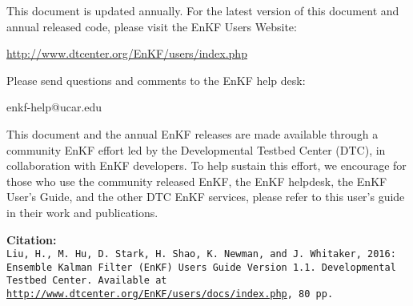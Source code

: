 \begin{titlepage}
\begin{flushleft}
This document is updated annually. For the latest version of this document and annual released code, please visit the EnKF User\textquotesingle s Website:
\begin{center}
 \url{http://www.dtcenter.org/EnKF/users/index.php}
 \end{center}
 Please send questions and comments to the EnKF help desk:
\begin{center}
enkf-help@ucar.edu
\end{center}
This document and the annual EnKF releases are made available through a community EnKF effort led by the Developmental Testbed Center (DTC), in collaboration with EnKF developers. To help sustain this effort, we encourage for those who use the community released EnKF, the EnKF helpdesk, the EnKF User's Guide, and the other DTC EnKF services, please refer to this user's guide in their work and publications.


\textbf{Citation:}\\
\texttt{Liu, H., M. Hu, D. Stark, H. Shao, K. Newman, and J. Whitaker, 2016: Ensemble Kalman Filter (EnKF) User\textquotesingle s Guide Version 1.1. Developmental Testbed Center. Available at \url{http://www.dtcenter.org/EnKF/users/docs/index.php}, 80 pp.}

\end{flushleft}
\end{titlepage}
\pagebreak{}




